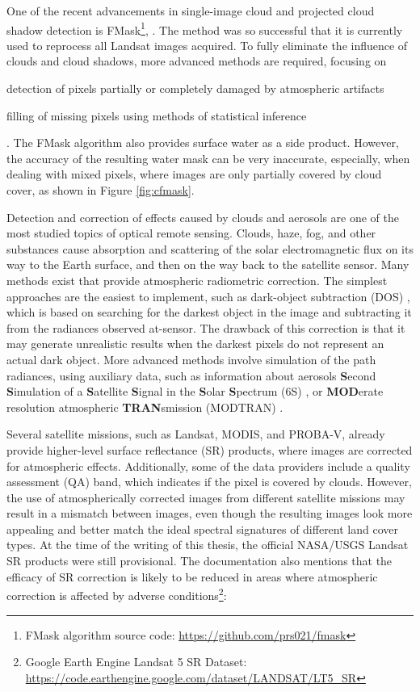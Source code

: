 One of the recent advancements in single-image cloud and projected cloud shadow detection is FMask\footnote{FMask algorithm source code: \url{https://github.com/prs021/fmask}}, \citet{Zhu2012, zhu2015improvement}. The method was so successful that it is currently used to reprocess all Landsat images acquired. To fully eliminate the influence of clouds and cloud shadows, more advanced methods are required, focusing on \begin{enumerate*}[label=(\emph{\alph*})]
	\item detection of pixels partially or completely damaged by atmospheric artifacts
	\item filling of missing pixels using methods of statistical inference
\end{enumerate*}. The FMask algorithm also provides surface water as a side product. However, the accuracy of the resulting water mask can be very inaccurate, especially, when dealing with mixed pixels, where images are only partially covered by cloud cover, as shown in Figure \ref{fig:cfmask}.

Detection and correction of effects caused by clouds and aerosols are one of the most studied topics of optical remote sensing. Clouds, haze, fog, and other substances cause absorption and scattering of the solar electromagnetic flux on its way to the Earth surface, and then on the way back to the satellite sensor. Many methods exist that provide atmospheric radiometric correction. The simplest approaches are the easiest to implement, such as dark-object subtraction (DOS) \citet{chavez1996image}, which is based on searching for the darkest object in the image and subtracting it from the radiances observed at-sensor. The drawback of this correction is that it may generate unrealistic results when the darkest pixels do not represent an actual dark object. More advanced methods involve simulation of the path radiances, using auxiliary data, such as information about aerosols \textbf{S}econd \textbf{S}imulation of a \textbf{S}atellite \textbf{S}ignal in the \textbf{S}olar \textbf{S}pectrum (6S) \citet{vermote1997second}, \citet{zhang2012improved} or \textbf{MOD}erate resolution atmospheric \textbf{TRAN}smission (MODTRAN) \citet{berk1987modtran}. 

Several satellite missions, such as Landsat, MODIS, and PROBA-V, already provide higher-level surface reflectance (SR) products, where images are corrected for atmospheric effects. Additionally, some of the data providers include a quality assessment (QA) band, which indicates if the pixel is covered by clouds. However, the use of atmospherically corrected images from different satellite missions may result in a mismatch between images, even though the resulting images look more appealing and better match the ideal spectral signatures of different land cover types. At the time of the writing of this thesis, the official NASA/USGS Landsat SR products were still provisional. The documentation also mentions that the efficacy of SR correction is likely to be reduced in areas where atmospheric correction is affected by adverse conditions\footnote{Google Earth Engine Landsat 5 SR Dataset: \url{https://code.earthengine.google.com/dataset/LANDSAT/LT5\_SR}}:

